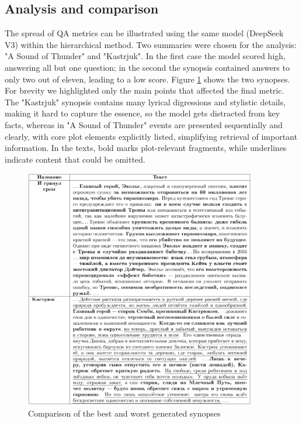 \documentclass{superfri}
\begin{document}
\subsection{Analysis and comparison}

The spread of QA metrics can be illustrated using the same model (DeepSeek V3) within the hierarchical method.
Two summaries were chosen for the analysis: "A Sound of Thunder" and "Kastrjuk".
In the first case the model scored high, answering all but one question; in the second
the synopsis contained answers to only two out of eleven, leading to a low score. 
Figure \ref{fig:refs} shows the two synopses. For brevity we highlighted only the main points that affected the final metric.
The "Kastrjuk" synopsis contains many lyrical digressions and stylistic details, making it hard to capture the essence, so the model gets distracted from key facts, 
whereas in "A Sound of Thunder" events are presented sequentially and clearly, with core plot elements explicitly listed, simplifying retrieval of important information.
In the texts, bold marks plot-relevant fragments, while underlines indicate content that could be omitted.

\begin{figure}[ht!]
  \centering
  \includegraphics[width=0.9\textwidth]{figures/two_ref.png}
  \caption{Comparison of the best and worst generated synopses}
  \label{fig:refs}
\end{figure}
\end{document}
